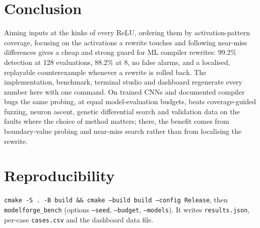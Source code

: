\documentclass[conference]{IEEEtran}
\begin{document}
\section{Conclusion}
Aiming inputs at the kinks of every ReLU, ordering them by activation-pattern coverage, focusing on the activations a rewrite touches and following near-miss differences gives a cheap and strong guard for ML compiler rewrites: 99.2\% detection at 128 evaluations, 88.2\% at 8, no false alarms, and a localised, replayable counterexample whenever a rewrite is rolled back. The implementation, benchmark, terminal studio and dashboard regenerate every number here with one command. On trained CNNs and documented compiler bugs the same probing, at equal model-evaluation budgets, beats coverage-guided fuzzing, neuron ascent, genetic differential search and validation data on the faults where the choice of method matters; there, the benefit comes from boundary-value probing and near-miss search rather than from localising the rewrite.

\section*{Reproducibility}
\texttt{cmake -S . -B build \&\& cmake --build build --config Release}, then \texttt{modelforge\_bench} (options \texttt{--seed}, \texttt{--budget}, \texttt{--models}). It writes \texttt{results.json}, per-case \texttt{cases.csv} and the dashboard data file.



\end{document}
